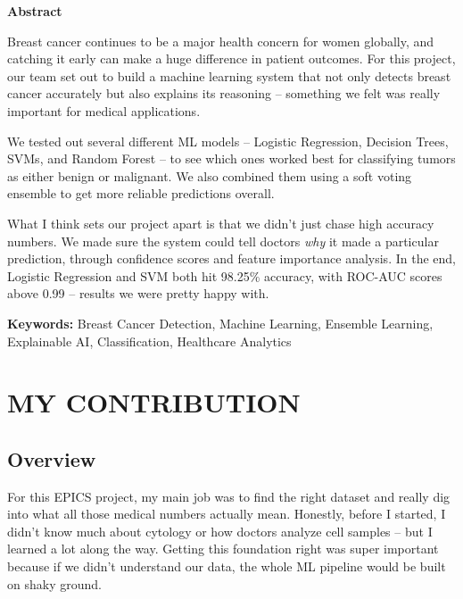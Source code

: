 \documentclass[12pt]{article}
\begin{document}
\newpage
{}
\begin{center}
    \textbf{\Large Abstract}
\end{center}

\noindent Breast cancer continues to be a major health concern for women globally, and catching it early can make a huge difference in patient outcomes. For this project, our team set out to build a machine learning system that not only detects breast cancer accurately but also explains its reasoning -- something we felt was really important for medical applications.

\vspace{0.5cm}
\noindent We tested out several different ML models -- Logistic Regression, Decision Trees, SVMs, and Random Forest -- to see which ones worked best for classifying tumors as either benign or malignant. We also combined them using a soft voting ensemble to get more reliable predictions overall.

\vspace{0.5cm}
\noindent What I think sets our project apart is that we didn't just chase high accuracy numbers. We made sure the system could tell doctors \textit{why} it made a particular prediction, through confidence scores and feature importance analysis. In the end, Logistic Regression and SVM both hit 98.25\% accuracy, with ROC-AUC scores above 0.99 -- results we were pretty happy with.

\vspace{0.5cm}
\noindent \textbf{Keywords:} Breast Cancer Detection, Machine Learning, Ensemble Learning, Explainable AI, Classification, Healthcare Analytics

\newpage
\tableofcontents

\newpage
{}
\section{MY CONTRIBUTION}

\subsection{Overview}
For this EPICS project, my main job was to find the right dataset and really dig into what all those medical numbers actually mean. Honestly, before I started, I didn't know much about cytology or how doctors analyze cell samples -- but I learned a lot along the way. Getting this foundation right was super important because if we didn't understand our data, the whole ML pipeline would be built on shaky ground.
\end{document}
